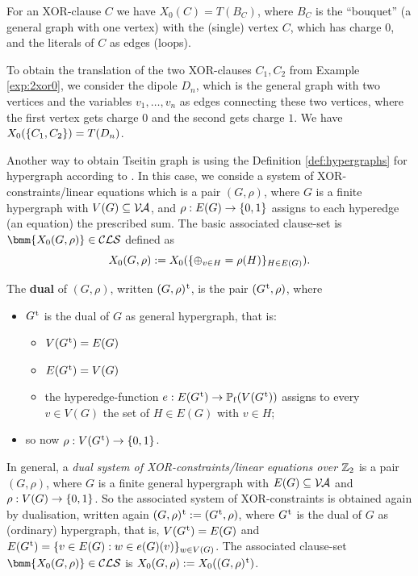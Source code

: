 \documentclass[]{book}
\begin{document}
\begin{examp}\label{exp:2xor0T}
  \cite{h8} For an XOR-clause $C$ we have $X_0(C) = T(B_C)$, where $B_C$ is the ``bouquet'' (a general graph with one vertex) with the (single) vertex 
  $C$, which has charge $0$, and the literals of $C$ as edges (loops).

  To obtain the translation of the two XOR-clauses $C_1, C_2$ from Example \ref{exp:2xor0}, we consider the dipole $D_n$, which is the general 
  graph with two vertices and the variables $v_1,\dots,v_n$ as edges connecting these two vertices, where the first vertex gets charge $0$ and 
  the second gets charge $1$. We have $X_0(\{ C_1,C_2 \}) = T(D_n)$.
\end{examp}
Another way to obtain Tseitin graph is using the Definition \ref{def:hypergraphs} for hypergraph according to \cite{h5}. 
In this case, we conside a system of XOR-constraints/linear equations which is a pair $(G,\rho)$, where $G$ is a finite hypergraph with 
$V(G) \subseteq \mathcal{V\hspace{-0.1em}A}$, and $\rho: E(G) \rightarrow \{ 0,1 \}$ assigns to each hyperedge (an equation) the prescribed sum. The basic associated 
clause-set is $\bmm{X_0(G,\rho)} \in \Cls$ defined as
\begin{displaymath}
  X_0(G,\rho) := X_0(\{ \oplus_{v \in H} = \rho(H) \}_{H \in E(G)}).
\end{displaymath}

The \textbf{dual} of $(G,\rho)$, written $(G,\rho)^{\hspace{0.05em}\mathrm{t}}$, is the pair $(G^{\hspace{0.05em}\mathrm{t}}, \rho)$, where
\begin{itemize}
\item $G^{\hspace{0.05em}\mathrm{t}}$ is the dual of $G$ as general hypergraph, that is:
  \begin{itemize}
  \item $V(G^{\hspace{0.05em}\mathrm{t}}) = E(G)$
  \item $E(G^{\hspace{0.05em}\mathrm{t}}) = V(G)$
  \item the hyperedge-function $e: E(G^{\hspace{0.05em}\mathrm{t}}) \rightarrow \operatorname{\mathbb{P}_f}(V(G^{\hspace{0.05em}\mathrm{t}}))$ assigns to every $v \in V(G)$ the set of $H \in E(G)$ with $v \in H$;
  \end{itemize}
\item so now $\rho: V(G^{\hspace{0.05em}\mathrm{t}}) \rightarrow \{ 0,1 \}$.
\end{itemize}
In general, a \emph{dual system of XOR-constraints/linear equations over $\mathbb{Z}_2$} is a pair $(G,\rho)$, where $G$ is a finite general hypergraph 
with $E(G) \subseteq \mathcal{V\hspace{-0.1em}A}$ and $\rho: V(G) \rightarrow \{ 0,1 \}$. So the associated system of XOR-constraints is obtained again by dualisation, written again 
$(G,\rho)^{\hspace{0.05em}\mathrm{t}} := (G^{\hspace{0.05em}\mathrm{t}},\rho)$, where $G^{\hspace{0.05em}\mathrm{t}}$ is the dual of $G$ as (ordinary) hypergraph, that is, $V(G^{\hspace{0.05em}\mathrm{t}}) = E(G)$ and $E(G^{\hspace{0.05em}\mathrm{t}}) = \{ v \in E(G) : w \in e(G)(v) \}_{w \in V(G)}$. 
The associated clause-set $\bmm{X_0(G,\rho)} \in \Cls$ is $X_0(G,\rho) := X_0((G,\rho)^{\hspace{0.05em}\mathrm{t}})$.
\end{document}
